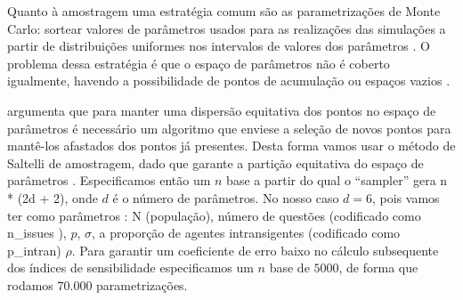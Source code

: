 Quanto à amostragem uma estratégia comum são as parametrizações de Monte Carlo:
sortear valores de parâmetros usados para as realizações das simulações a partir
de distribuições uniformes nos intervalos de valores dos parâmetros
\cite{laver2011party}. O problema dessa estratégia é que o espaço de parâmetros
não é coberto igualmente, havendo a possibilidade de pontos de acumulação ou
espaços vazios \cite{pereda2017brief}.

 argumenta que para manter uma dispersão equitativa
dos pontos no espaço de parâmetros é necessário um algoritmo que enviese a
seleção de novos pontos para mantê-los afastados dos pontos já presentes. Desta
forma vamos usar o método de Saltelli de amostragem, dado que garante a partição
equitativa do espaço de parâmetros \cite{herman2017salib}. Especificamos então
um \(n\) base a partir do qual o ``sampler'' gera n * (2d + 2), onde \(d\) é o
número de parâmetros. No nosso caso \(d = 6\), pois vamos ter como parâmetros :
N (população), número de questões (codificado como n\_issues ), \(p\), \(\sigma\), a
proporção de agentes intransigentes (codificado como p\_intran)
\(\rho\). Para garantir um coeficiente de erro baixo no cálculo
subsequente dos índices de sensibilidade especificamos um \(n\) base de
\(5000\), de forma que rodamos \(70.000\) parametrizações.



